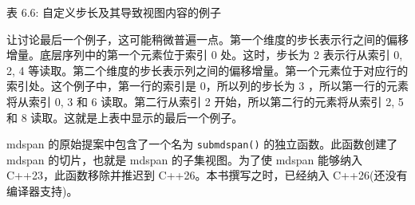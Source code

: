 \begin{center}
表 6.6: 自定义步长及其导致视图内容的例子
\end{center}

让讨论最后一个例子，这可能稍微普遍一点。第一个维度的步长表示行之间的偏移增量。底层序列中的第一个元素位于索引 0 处。这时，步长为 2 表示行从索引 0, 2, 4 等读取。第二个维度的步长表示列之间的偏移增量。第一个元素位于对应行的索引处。这个例子中，第一行的索引是 0，所以列的步长为 3 ，所以第一行的元素将从索引 0, 3 和 6 读取。第二行从索引 2 开始，所以第二行的元素将从索引 2, 5 和 8 读取。这就是上表中显示的最后一个例子。


mdspan 的原始提案中包含了一个名为 \verb|submdspan()| 的独立函数。此函数创建了 mdspan 的切片，也就是 mdspan 的子集视图。为了使 mdspan 能够纳入 C++23，此函数移除并推迟到 C++26。本书撰写之时，已经纳入 C++26(还没有编译器支持)。


